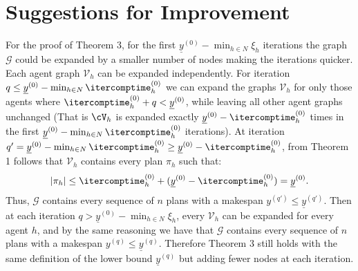 \documentclass{article}
\begin{document}


\section*{Suggestions for Improvement}

For the proof of Theorem 3, for the first \(\underline{y}^{(0)}- \min_{h \in N}\xi_h\) iterations the graph \(\mathcal{G}\)
 could be expanded by a smaller number of nodes making the iterations quicker.
%
Each agent graph \(\mathcal{V}_h\) can be expanded independently.
% 
For iteration \( q \leq \underline{y}^{(0)}- \min_{h \in N}\itercomptime_h^{(0)}\) we can expand the graphs \(\mathcal{V}_h\)  for only those agents where \(\itercomptime_h^{(0)}+q < \underline{y}^{(0)}\), while leaving all other agent graphs unchanged (That is \(\cV_h\) is expanded exactly \( \underline{y}^{(0)}- \itercomptime_h^{(0)}\) times in the first \(\underline{y}^{(0)}- \min_{h \in N}\itercomptime_h^{(0)}\) iterations).
%
At iteration \(q' = \underline{y}^{(0)}- \min_{h \in N}\itercomptime_h^{(0)} \geq  \underline{y}^{(0)}- \itercomptime_h^{(0)}\), from Theorem 1 follows that
\(\mathcal{V}_h\) contains every plan  \(\pi_h\) such that:
 \[|\pi_h| \leq  \itercomptime_h^{(0)} + (\underline{y}^{(0)}- \itercomptime_h^{(0)}) = \underline{y}^{(0)}.\]
%
Thus, \(\mathcal{G}\) contains every sequence of \(n\) plans with a makespan \(y^{(q')} \leq \underline{y}^{(q')}\). 
%
Then at each iteration \(q > \underline{y}^{(0)} - \min_{h \in N}\xi_h\),
 every \(\mathcal{V}_h\) can be expanded for every agent \(h\), and by the same reasoning we have 
that \(\mathcal{G}\) contains every sequence of \(n\) plans with a makespan \(y^{(q)} \leq \underline{y}^{(q)}\).
Therefore Theorem 3 still holds with the same definition of the lower bound \(\underline{y}^{(q)}\) but adding fewer nodes at each iteration.
\end{document}
